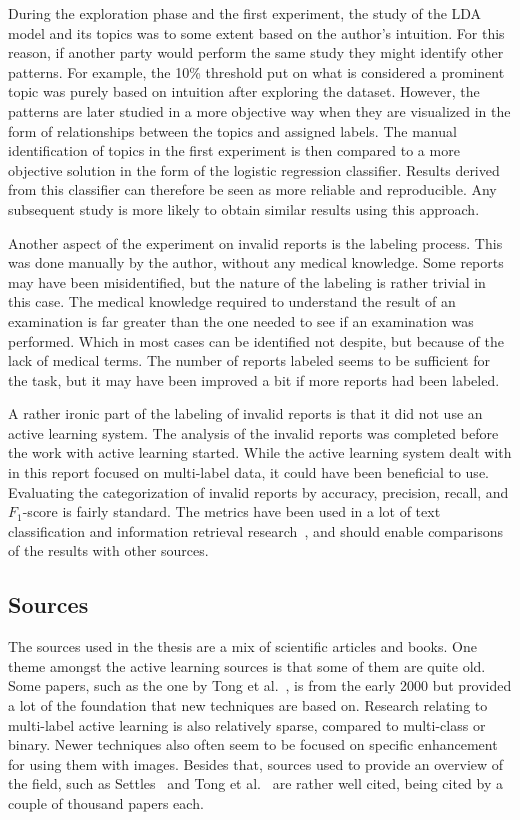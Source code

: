 During the exploration phase and the first experiment, the study of the LDA model and its topics was to some extent based on the author's intuition.
For this reason, if another party would perform the same study they might identify other patterns.
For example, the 10\% threshold put on what is considered a prominent topic was purely based on intuition after exploring the dataset.
However, the patterns are later studied in a more objective way when they are visualized in the form of relationships between the topics and assigned labels.
The manual identification of topics in the first experiment is then compared to a more objective solution in the form of the logistic regression classifier.
Results derived from this classifier can therefore be seen as more reliable and reproducible.
Any subsequent study is more likely to obtain similar results using this approach.

Another aspect of the experiment on invalid reports is the labeling process.
This was done manually by the author, without any medical knowledge.
Some reports may have been misidentified, but the nature of the labeling is rather trivial in this case.
The medical knowledge required to understand the result of an examination is far greater than the one needed to see if an examination was performed.
Which in most cases can be identified not despite, but because of the lack of medical terms.
The number of reports labeled seems to be sufficient for the task, but it may have been improved a bit if more reports had been labeled.

A rather ironic part of the labeling of invalid reports is that it did not use an active learning system.
The analysis of the invalid reports was completed before the work with active learning started.
While the active learning system dealt with in this report focused on multi-label data, it could have been beneficial to use.
Evaluating the categorization of invalid reports by accuracy, precision, recall, and $F_1$-score is fairly standard.
The metrics have been used in a lot of text classification and information retrieval research~\cite{aggarwal2012surveyclass, bishop2006pattern}, and should enable comparisons of the results with other sources.

\subsection{Sources}

The sources used in the thesis are a mix of scientific articles and books.
One theme amongst the active learning sources is that some of them are quite old.
Some papers, such as the one by Tong et al.~\cite{tong2001support}, is from the early 2000 but provided a lot of the foundation that new techniques are based on.
Research relating to multi-label active learning is also relatively sparse, compared to multi-class or binary.
Newer techniques also often seem to be focused on specific enhancement for using them with images.
Besides that, sources used to provide an overview of the field, such as Settles~\cite{settles2012active} and Tong et al\@.~\cite{tong2001active} are rather well cited, being cited by a couple of thousand papers each.


